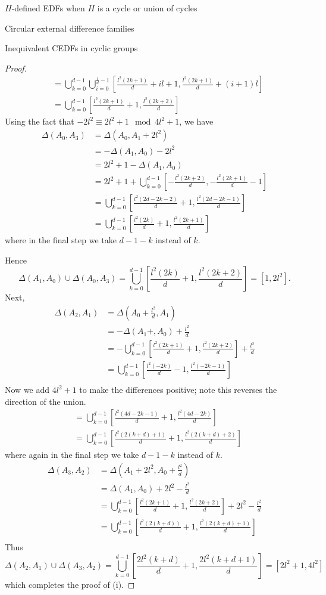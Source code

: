 \documentclass[12pt, a4paper]{article}
\theoremstyle{definition}
\begin{document}
\begin{section}{$H$-defined EDFs when $H$ is a cycle or union of cycles}
\begin{subsection}{Circular external difference families}
\begin{subsection}{Inequivalent CEDFs in cyclic groups}
\begin{proof}
\begin{align*}
&=\bigcup_{k=0}^{d-1}\bigcup_{i=0}^{\frac{l}{d}-1}[\frac{l^2(2k+1)}{d}+il+1, \frac{l^2(2k+1)}{d}+(i+1)l ]\\
&=\bigcup_{k=0}^{d-1} [\frac{l^2(2k+1)}{d}+1, \frac{l^2(2k+2)}{d}]
\end{align*}
Using the fact that $-2l^2 \equiv 2l^2+1 \mod 4l^2+1$, we have
\begin{align*}
\Delta(A_0,A_3) &=\Delta(A_0,A_1+2l^2)\\
&=-\Delta(A_1,A_0)-2l^2\\
&= 2l^2+1 - \Delta(A_1,A_0)\\
&= 2l^2+1 + \bigcup_{k=0}^{d-1} [-\frac{l^2(2k+2)}{d},-\frac{l^2(2k+1)}{d}-1]\\
&=\bigcup_{k=0}^{d-1} [\frac{l^2(2d-2k-2)}{d}+1, \frac{l^2(2d-2k-1)}{d}]\\
&=\bigcup_{k=0}^{d-1} [\frac{l^2(2k)}{d}+1, \frac{l^2(2k+1)}{d}]
\end{align*}
where in the final step we take $d-1-k$ instead of $k$.

Hence 
$$\Delta(A_1,A_0) \cup \Delta(A_0,A_3) =\bigcup_{k=0}^{d-1} [\frac{l^2(2k)}{d}+1, \frac{l^2(2k+2)}{d}]=[1,2l^2].$$
Next,
\begin{align*}
\Delta(A_2,A_1) &=\Delta(A_0+\frac{l^2}{d},A_1)\\
&=-\Delta(A_1+,A_0)+\frac{l^2}{d}\\
&=-\bigcup_{k=0}^{d-1} [\frac{l^2(2k+1)}{d}+1, \frac{l^2(2k+2)}{d}]+\frac{l^2}{d}\\
&=\bigcup_{k=0}^{d-1} [\frac{l^2(-2k)}{d}-1, \frac{l^2(-2k-1)}{d}]\\
\end{align*}
Now we add $4l^2+1$ to make the differences positive; note this reverses the direction of the union.
\begin{align*}
&=\bigcup_{k=0}^{d-1} [\frac{l^2(4d-2k-1)}{d}+1, \frac{l^2(4d-2k)}{d}]\\
&=\bigcup_{k=0}^{d-1} [\frac{l^2(2(k+d)+1)}{d}+1, \frac{l^2(2(k+d)+2)}{d}]
\end{align*}
where again in the final step we take $d-1-k$ instead of $k$.
\begin{align*}
\Delta(A_3,A_2) &=\Delta(A_1+2l^2,A_0+\frac{l^2}{d})\\
&=\Delta(A_1,A_0)+2l^2-\frac{l^2}{d}\\
&=\bigcup_{k=0}^{d-1} [\frac{l^2(2k+1)}{d}+1, \frac{l^2(2k+2)}{d}]+2l^2-\frac{l^2}{d}\\
&=\bigcup_{k=0}^{d-1} [\frac{l^2 (2(k+d))}{d}+1, \frac{l^2 (2(k+d)+1)}{d}]\\
\end{align*}
Thus
$$\Delta(A_2,A_1) \cup \Delta(A_3,A_2) =\bigcup_{k=0}^{d-1} [\frac{2l^2(k+d)}{d}+1, \frac{2l^2(k+d+1)}{d}]=[2l^2+1,4l^2]$$
which completes the proof of (i).



\end{proof}
\end{subsection}
\end{subsection}
\end{section}
\end{document}
